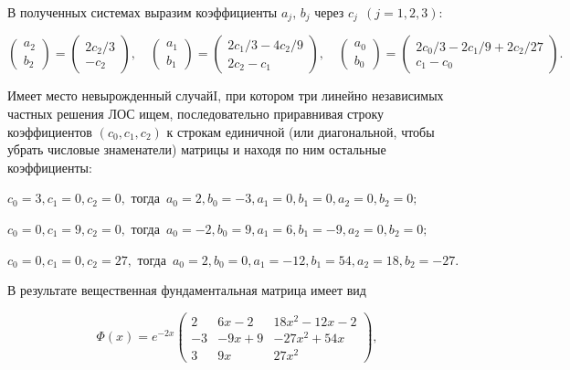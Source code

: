 \documentclass[11pt]{article}
\begin{document}
{\smallskip
В полученных системах выразим коэффициенты $a_j,\,b_j$ через $c_j\ \ (j=1,2,3):$

\smallskip
$ %
\begin{pmatrix}
a_2 \\ b_2
\end{pmatrix}
=
\begin{pmatrix}
2c_2/3 \\ -c_2
\end{pmatrix},
\quad
\begin{pmatrix}
a_1 \\ b_1
\end{pmatrix}
=
\begin{pmatrix}
2c_1/3 - 4c_2/9 \\ 2c_2 - c_1
\end{pmatrix},
\quad
\begin{pmatrix}
a_0 \\ b_0
\end{pmatrix}
=
\begin{pmatrix}
2c_0/3 - 2c_1/9 + 2c_2/27 \\ c_1 - c_0
\end{pmatrix}.
$ %

\smallskip
Имеет место невырожденный случай\;I, при котором три линейно независимых частных решения ЛОС ищем,
последовательно приравнивая строку коэффициентов $(c_0,c_1,c_2)$ к строкам единичной (или диагональной, чтобы убрать числовые знаменатели) матрицы и находя по ним остальные коэффициенты:

\smallskip 
$c_0=3, c_1=0, c_2=0,$ тогда \,$a_0=2, b_0=-3, a_1=0, b_1=0, a_2=0, b_2=0;$ 

$c_0=0, c_1=9, c_2=0,$ тогда \,$a_0=-2, b_0=9, a_1=6, b_1=-9, a_2=0, b_2=0;$ 

$c_0=0, c_1=0, c_2=27,$ тогда \,$a_0=2, b_0=0, a_1=-12, b_1=54, a_2=18, b_2=-27.$

\smallskip
В результате вещественная фундаментальная матрица имеет вид

\smallskip
$$\Phi(x)=e^{-2x}\begin{pmatrix} 2 & 6x - 2 & 18x^2 - 12x - 2 \\ -3 & - 9x + 9 & - 27x^2 + 54x \\ 3 & 9x & 27x^2 \end{pmatrix},$$ %

}
\end{document}
